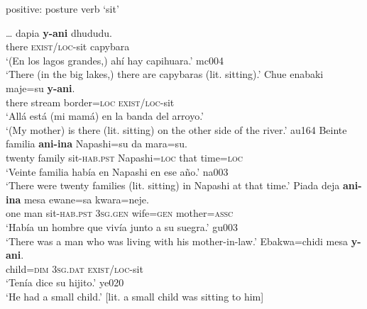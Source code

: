 \documentclass[output=paper]{langsci/langscibook}
\begin{document}
\begin{exe}\ex\label{ex:tacana-posture-sit} positive: posture verb `sit' 
\begin{xlist}
\ex\label{ex:tacana-posture-sit-capybaras}
\gll \ldots{} dapia \textbf{y-ani} dhududu.\\
    {}  there  \textsc{exist/loc}-sit  capybara\\
\glt `(En los lagos grandes,) ahí hay capihuara.' mc004\\
`There (in the big lakes,) there are capybaras (lit. sitting).'
\ex\label{ex:tacana-posture-sit-mother}
\gll {}Chue enabaki maje=su{\cb} \textbf{y-ani}.\\
    there  stream  border=\textsc{loc}  \textsc{exist/loc}-sit\\
\glt `Allá está (mi mamá) en la banda del arroyo.'\\
`(My mother) is there (lit. sitting) on the other side of the river.' au164
\ex\label{ex:tacana-posture-sit-families}
\gll {}Beinte familia{\cb} \textbf{ani-ina} Napashi=su {\ob}da
mara=su{\cb}.\\
    twenty  family  sit-\textsc{hab.pst}
    Napashi=\textsc{loc}  that  time=\textsc{loc}\\
\glt `Veinte familia había en Napashi en ese año.' na003\\
`There were twenty families (lit. sitting) in Napashi at that time.'
\ex\label{ex:tacana-posture-sit-anoppi}
 \gll {}Piada deja{\cb} \textbf{ani-ina}
    mesa ewane=sa kwara=neje{\cb}.\\
    one  man  sit-\textsc{hab.pst}  \textsc{3sg.gen}
    wife=\textsc{gen}  mother=\textsc{assc}\\
\glt `Había un hombre que vivía junto a su suegra.' gu003\\
`There was a man who was living with his mother-in-law.'
\ex\label{ex:tacana-posture-sit-child}
 \gll {}Ebakwa=chidi mesa
    \textbf{y-ani}.\\
 child=\textsc{dim}  \textsc{3sg.dat}  \textsc{exist/loc}-sit\\
\glt `Tenía dice su hijito.' ye020\\
`He had a small child.' [lit. a small child was sitting to him]
\end{xlist}


\end{exe}
\end{document}
